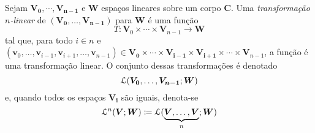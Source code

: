 \begin{defi}
Sejam $\bm{V_0},\cdots,\bm{V_{n-1}}$ e $\bm W$ espaços lineares sobre um corpo $\bm C$. Uma \emph{transformação $n$-linear} de $(\bm{V_0},\ldots,\bm{V_{n-1}})$ para $\bm W$ é uma função
	\begin{equation*}
	T: \bm V_0 \times \cdots \times \bm V_{n-1} \to \bm W
	\end{equation*}
tal que, para todo $i \in n$ e $(\bm v_0,\ldots,\bm v_{i-1},\bm v_{i+1},\ldots,\bm v_{n-1}) \in \bm{V_0} \times \cdots \times \bm{V_{i-1}} \times \bm{V_{i+1}} \times \cdots \times \bm V_{n-1}$, a função
é uma transformação linear. O conjunto dessas transformações é denotado
	\begin{equation*}
	\mathcal{L}(\bm{V_0},\ldots,\bm{V_{n-1}};\bm W)
	\end{equation*}
e, quando todos os espaços $\bm{V_i}$ são iguais, denota-se
	\begin{equation*}
	\lin^n(\bm V;\bm W) \coloneqq \lin(\underbrace{\bm V,\ldots,\bm V}_n;\bm W)
	\end{equation*}
\end{defi}

